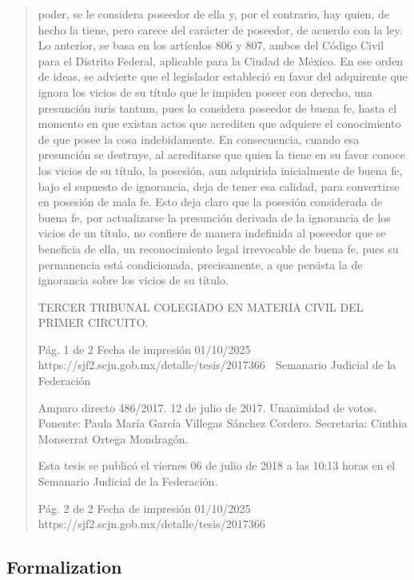 \documentclass[11pt,a4paper]{article}
\begin{document}
\begin{quote}
poder, se le considera poseedor de ella y, por el contrario, hay quien, de hecho la tiene, pero carece
del carácter de poseedor, de acuerdo con la ley. Lo anterior, se basa en los artículos 806 y 807,
ambos del Código Civil para el Distrito Federal, aplicable para la Ciudad de México. En ese orden
de ideas, se advierte que el legislador estableció en favor del adquirente que ignora los vicios de su
título que le impiden poseer con derecho, una presunción iuris tantum, pues lo considera poseedor
de buena fe, hasta el momento en que existan actos que acrediten que adquiere el conocimiento de
que posee la cosa indebidamente. En consecuencia, cuando esa presunción se destruye, al
acreditarse que quien la tiene en su favor conoce los vicios de su título, la posesión, aun adquirida
inicialmente de buena fe, bajo el supuesto de ignorancia, deja de tener esa calidad, para convertirse
en posesión de mala fe. Esto deja claro que la posesión considerada de buena fe, por actualizarse
la presunción derivada de la ignorancia de los vicios de un título, no confiere de manera indefinida al
poseedor que se beneficia de ella, un reconocimiento legal irrevocable de buena fe, pues su
permanencia está condicionada, precisamente, a que persista la de ignorancia sobre los vicios de
su título.

TERCER TRIBUNAL COLEGIADO EN MATERIA CIVIL DEL PRIMER CIRCUITO.


                                              Pág. 1 de 2             Fecha de impresión 01/10/2025
  https://sjf2.scjn.gob.mx/detalle/tesis/2017366
                                                   Semanario Judicial de la Federación



Amparo directo 486/2017. 12 de julio de 2017. Unanimidad de votos. Ponente: Paula María García
Villegas Sánchez Cordero. Secretaria: Cinthia Monserrat Ortega Mondragón.


Esta tesis se publicó el viernes 06 de julio de 2018 a las 10:13 horas en el Semanario Judicial de la
Federación.




                                              Pág. 2 de 2            Fecha de impresión 01/10/2025
  https://sjf2.scjn.gob.mx/detalle/tesis/2017366

\end{quote}

\subsection{Formalization}
\end{document}
